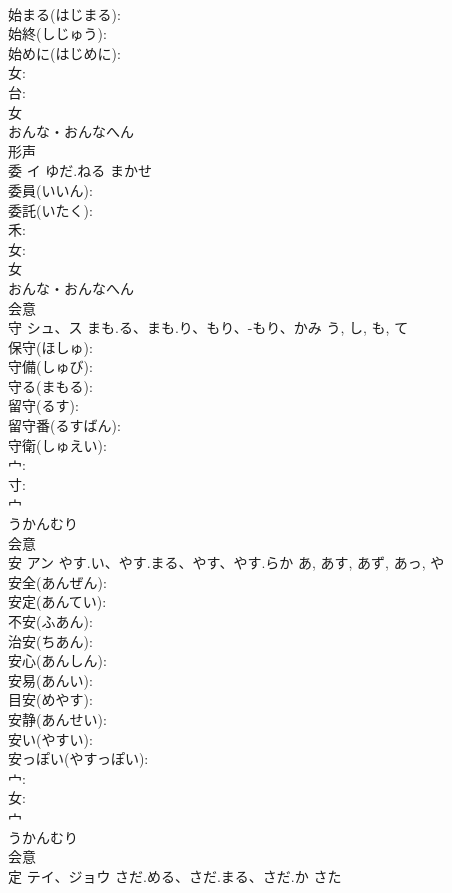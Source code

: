 \documentclass[8pt]{extreport}
\begin{document}
\begin{CJK}{UTF8}{min}
\\	始まる(はじまる): 
\\	始終(しじゅう): 
\\	始めに(はじめに): 
\\	女: 
\\	台: 
\\	女	
\\	おんな・おんなへん	
\\	形声 
\\	委	イ	ゆだ.ねる	まかせ	
\\	委員(いいん): 
\\	委託(いたく): 
\\	禾: 
\\	女: 
\\	女	
\\	おんな・おんなへん	
\\	会意 
\\	守	シュ、ス	まも.る、まも.り、もり、-もり、かみ	う, し, も, て	
\\	保守(ほしゅ): 
\\	守備(しゅび): 
\\	守る(まもる): 
\\	留守(るす): 
\\	留守番(るすばん): 
\\	守衛(しゅえい): 
\\	宀: 
\\	寸: 
\\	宀	
\\	うかんむり	
\\	会意 
\\	安	アン	やす.い、やす.まる、やす、やす.らか	あ, あす, あず, あっ, や	
\\	安全(あんぜん): 
\\	安定(あんてい): 
\\	不安(ふあん): 
\\	治安(ちあん): 
\\	安心(あんしん): 
\\	安易(あんい): 
\\	目安(めやす): 
\\	安静(あんせい): 
\\	安い(やすい): 
\\	安っぽい(やすっぽい): 
\\	宀: 
\\	女: 
\\	宀	
\\	うかんむり	
\\	会意 
\\	定	テイ、ジョウ	さだ.める、さだ.まる、さだ.か	さた	

\end{CJK}
\end{document}
